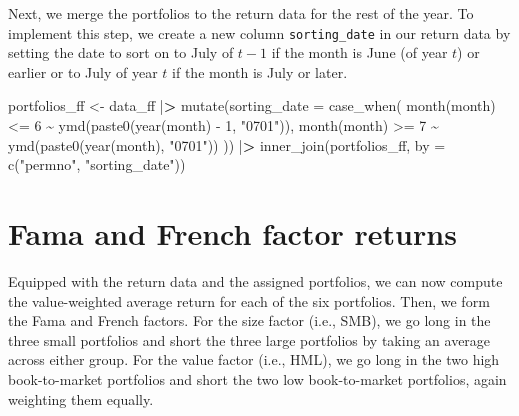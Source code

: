 \documentclass[
]{book}
\newenvironment{Shaded}{\begin{snugshade}}{\end{snugshade}}
\newcommand{\AttributeTok}[1]{\textcolor[rgb]{0.61,0.61,0.61}{#1}}
\newcommand{\DecValTok}[1]{\textcolor[rgb]{0.06,0.06,0.06}{#1}}
\newcommand{\ErrorTok}[1]{\textcolor[rgb]{0.14,0.14,0.14}{\textbf{#1}}}
\newcommand{\FunctionTok}[1]{\textcolor[rgb]{0,0,0}{#1}}
\newcommand{\NormalTok}[1]{#1}
\newcommand{\OtherTok}[1]{\textcolor[rgb]{0.37,0.37,0.37}{#1}}
\newcommand{\SpecialCharTok}[1]{\textcolor[rgb]{0,0,0}{#1}}
\newcommand{\StringTok}[1]{\textcolor[rgb]{0.5,0.5,0.5}{#1}}
\begin{document}
Next, we merge the portfolios to the return data for the rest of the year. To implement this step, we create a new column \texttt{sorting\_date} in our return data by setting the date to sort on to July of \(t-1\) if the month is June (of year \(t\)) or earlier or to July of year \(t\) if the month is July or later.

\begin{Shaded}
\begin{Highlighting}[]
\NormalTok{portfolios\_ff }\OtherTok{\textless{}{-}}\NormalTok{ data\_ff }\SpecialCharTok{|}\ErrorTok{\textgreater{}}
  \FunctionTok{mutate}\NormalTok{(}\AttributeTok{sorting\_date =} \FunctionTok{case\_when}\NormalTok{(}
    \FunctionTok{month}\NormalTok{(month) }\SpecialCharTok{\textless{}=} \DecValTok{6} \SpecialCharTok{\textasciitilde{}} \FunctionTok{ymd}\NormalTok{(}\FunctionTok{paste0}\NormalTok{(}\FunctionTok{year}\NormalTok{(month) }\SpecialCharTok{{-}} \DecValTok{1}\NormalTok{, }\StringTok{"0701"}\NormalTok{)),}
    \FunctionTok{month}\NormalTok{(month) }\SpecialCharTok{\textgreater{}=} \DecValTok{7} \SpecialCharTok{\textasciitilde{}} \FunctionTok{ymd}\NormalTok{(}\FunctionTok{paste0}\NormalTok{(}\FunctionTok{year}\NormalTok{(month), }\StringTok{"0701"}\NormalTok{))}
\NormalTok{  )) }\SpecialCharTok{|}\ErrorTok{\textgreater{}}
  \FunctionTok{inner\_join}\NormalTok{(portfolios\_ff, }\AttributeTok{by =} \FunctionTok{c}\NormalTok{(}\StringTok{"permno"}\NormalTok{, }\StringTok{"sorting\_date"}\NormalTok{))}
\end{Highlighting}
\end{Shaded}

\hypertarget{fama-and-french-factor-returns}{%
\section{Fama and French factor returns}\label{fama-and-french-factor-returns}}

Equipped with the return data and the assigned portfolios, we can now compute the value-weighted average return for each of the six portfolios. Then, we form the Fama and French factors. For the size factor (i.e., SMB), we go long in the three small portfolios and short the three large portfolios by taking an average across either group. For the value factor (i.e., HML), we go long in the two high book-to-market portfolios and short the two low book-to-market portfolios, again weighting them equally.
\end{document}
